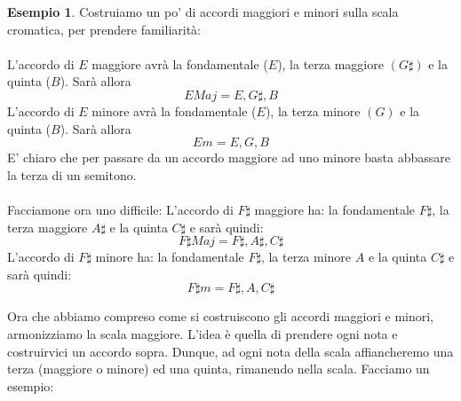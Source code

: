 \documentclass[12pt,a4paper]{report}
\theoremstyle{definition}
\theoremstyle{Theorem}
\theoremstyle{definition}
\newtheorem{Ex}[Def]{Esempio}
\theoremstyle{definition}
\theoremstyle{definition}
\begin{document}
	 		\begin{Ex}
	 			Costruiamo un po' di accordi maggiori e minori sulla scala cromatica, per prendere familiarità:\\
	 			\\
	 			L'accordo di $E$ maggiore avrà la fondamentale ($E$), la terza maggiore $(G\sharp)$ e la quinta ($B$). Sarà allora
	 			$$EMaj=E,G\sharp,B$$
	 			L'accordo di $E$ minore avrà la fondamentale ($E$), la terza minore $(G)$ e la quinta ($B$). Sarà allora 
	 			$$Em=E,G,B$$
	 			E' chiaro che per passare da un accordo maggiore ad uno minore basta abbassare la terza di un semitono.\\
	 			\\
	 			Facciamone ora uno difficile: L'accordo di $F\sharp$ maggiore ha: la fondamentale $F\sharp$, la terza maggiore $A\sharp$ e la quinta $C\sharp$ e sarà quindi:
	 			$$F\sharp Maj=F\sharp,A\sharp,C\sharp$$
	 			L'accordo di $F\sharp$ minore ha: la fondamentale $F\sharp$, la terza minore $A$ e la quinta $C\sharp$ e sarà quindi:
	 			$$F\sharp m=F\sharp,A,C\sharp$$
	 		\end{Ex}
	 		Ora che abbiamo compreso come si costruiscono gli accordi maggiori e minori, armonizziamo la scala maggiore. L'idea è quella di prendere ogni nota e costruirvici un accordo sopra. Dunque, ad ogni nota della scala affiancheremo una terza (maggiore o minore) ed una quinta, rimanendo nella scala. Facciamo un esempio:
\end{document}
